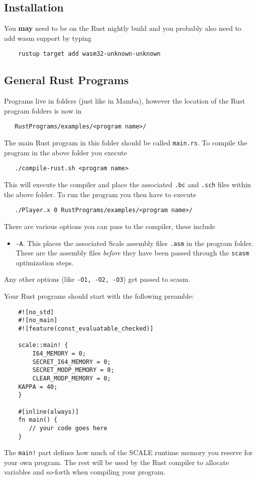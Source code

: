 
\subsection{Installation}
You {\bf may} need to be on the Rust nightly build and
you probably also need to add wasm support by typing
\begin{verbatim}
    rustup target add wasm32-unknown-unknown
\end{verbatim}

\subsection{General Rust Programs}
Programs live in folders (just like in Mamba),
however the location of the Rust program folders is now
in
\begin{verbatim}
   RustPrograms/examples/<program name>/
\end{verbatim}
The main Rust program in this folder should be called
\verb|main.rs|. To compile the program in the above
folder you execute
\begin{verbatim}
   ./compile-rust.sh <program name>
\end{verbatim}
This will execute the compiler and place the associated \verb|.bc|
and \verb|.sch| files within the above folder.
To run the program you then have to execute
\begin{verbatim}
   ./Player.x 0 RustPrograms/examples/<program name>/
\end{verbatim}
There are various options you can pass to the compiler,
these include
\begin{itemize}
     \item  \verb|-A|. This places the associated Scale assembly
           files \verb|.asm| in the program folder. These are the
           assembly files {\em before} they have been passed through
           the \verb|scasm| optimization steps.
\end{itemize}
Any other options (like \verb|-O1, -O2, -O3|) get passed to scasm.

\vspace{3mm}

\noindent
Your Rust programs should start with the following preamble:
\begin{lstlisting}
    #![no_std]
    #![no_main]
    #![feature(const_evaluatable_checked)]

    scale::main! {
        I64_MEMORY = 0;
        SECRET_I64_MEMORY = 0;
        SECRET_MODP_MEMORY = 0;
        CLEAR_MODP_MEMORY = 0;
	KAPPA = 40;
    }

    #[inline(always)]
    fn main() {
       // your code goes here
    }
\end{lstlisting}
The \verb|main!| part defines how much of the SCALE runtime memory you
reserve for your own program. The rest will be used by the Rust compiler
to allocate variables and so-forth when compiling your program.


